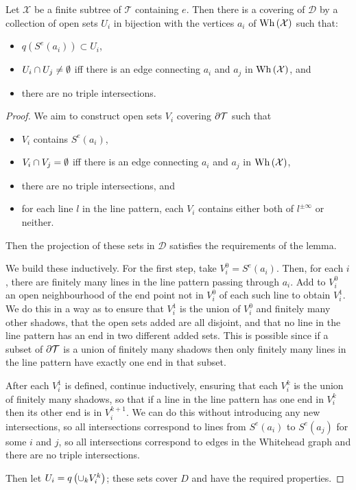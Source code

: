 \begin{lem}\label{lem:construction} Let $\mathcal{X}$ be a finite subtree of
$\mathcal{T}$ containing $e$.  Then there is a covering of $\mathcal{D}$
by a collection of open sets $U_i$ in bijection with the vertices $a_i$ of
$\mathrm{Wh}\left(\mathcal{X}\right)$ such that:
\begin{itemize}
\item $q\left(S^e\left(a_i\right)\right) \subset U_i$, 
\item $U_i \cap U_j \neq \emptyset$ iff there is an edge connecting
  $a_i$ and $a_j$ in $\mathrm{Wh}\left(\mathcal{X}\right)$, and
\item there are no triple intersections.
\end{itemize}
\end{lem}

\begin{proof}
We aim to construct open sets $V_i$ covering $\partial\mathcal{T}$ such
that
\begin{itemize}
\item $V_i$ contains $S^e\left(a_i\right)$,
\item $V_i \cap V_j = \emptyset$ iff there is an edge connecting
  $a_i$ and $a_j$ in $\mathrm{Wh}\left(\mathcal{X}\right)$, 
\item there are no triple intersections, and
\item for each line $l$ in the line pattern, each $V_i$ contains either
  both of $l^{\pm\infty}$ or neither.
\end{itemize}
Then the projection of these sets in $\mathcal{D}$ satisfies the requirements
of the lemma.

We build these inductively. For the first step, take $V_i^0 =
S^e\left(a_i\right)$. Then, for each $i$, there are finitely many lines in
the line pattern passing through $a_i$. Add to $V_i^0$ an open
neighbourhood of the end point not in $V_i^0$ of each such line to obtain
$V_i^1$. We do this in a way as to ensure that $V_i^1$ is the union of
$V_i^0$ and finitely many other shadows, that the open sets added are all
disjoint, and that no line in the line pattern has an end in two different
added sets. This is possible since if a subset of $\partial \mathcal{T}$ is
a union of finitely many shadows then only finitely many lines in the line
pattern have exactly one end in that subset.

After each $V_i^1$ is defined, continue inductively, ensuring that each
$V_i^k$ is the union of finitely many shadows, so that if a line in the line
pattern has one end in $V_i^k$ then its other end is in $V_i^{k+1}$. We can
do this without introducing any new intersections, so all intersections
correspond to lines from $S^e\left(a_i\right)$ to $S^e\left(a_j\right)$
for some $i$ and $j$, so all intersections correspond to edges in the
Whitehead graph and there are no triple intersections.

Then let $U_i = q\left(\cup_k V_i^k\right)$; these sets cover $D$ and
have the required properties. \end{proof}

